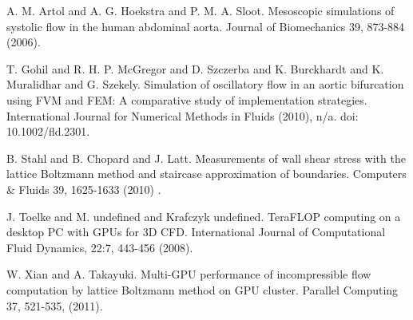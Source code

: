 
\begin{thebibliography}{10}

{\sc A. M. Artol and A. G. Hoekstra and P. M. A. Sloot}. {Mesoscopic simulations of systolic flow in the human abdominal aorta}. Journal of Biomechanics 39, 873-884 (2006).



{\sc T. Gohil and R. H. P. McGregor and D. Szczerba and K. Burckhardt and K. Muralidhar and G. Szekely}. {Simulation of oscillatory flow in an aortic bifurcation using FVM and FEM: A comparative study of implementation strategies}. International Journal for Numerical Methods in Fluids (2010), n/a. doi: 10.1002/fld.2301.



{\sc B. Stahl and B. Chopard and J. Latt}. {Measurements of wall shear stress with the lattice Boltzmann method and staircase approximation of boundaries}. Computers \& Fluids 39, 1625-1633 (2010) .



{\sc J. Toelke and M. undefined and Krafczyk undefined}. {TeraFLOP computing on a desktop PC with GPUs for 3D CFD}. International Journal of Computational Fluid Dynamics, 22:7, 443-456 (2008).



{\sc W. Xian and A. Takayuki}. {Multi-GPU performance of incompressible flow computation by lattice Boltzmann method on GPU cluster}. Parallel Computing 37, 521-535, (2011).

\end{thebibliography}
